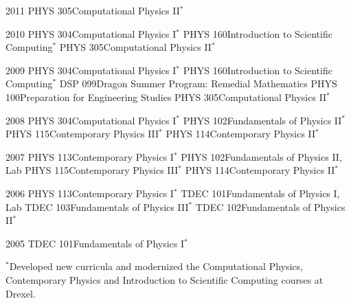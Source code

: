 \documentclass[]{scrartcl}
\begin{document}
\begin{cleanCV}





\newcommand{\TeachingNote}{$^*$}

\Teaching
{2011}
{PHYS 305}{Computational Physics II\TeachingNote}

\Teaching
{2010}
{PHYS 304}{Computational Physics I\TeachingNote}
\Teaching
{}
{PHYS 160}{Introduction to Scientific Computing\TeachingNote}
\Teaching
{}
{PHYS 305}{Computational Physics II\TeachingNote}

\Teaching
{2009}
{PHYS 304}{Computational Physics I\TeachingNote}
\Teaching
{}
{PHYS 160}{Introduction to Scientific Computing\TeachingNote}
\Teaching
{}
{DSP 099}{Dragon Summer Program: Remedial Mathematics}
\Teaching
{}
{PHYS 100}{Preparation for Engineering Studies}
\Teaching
{}
{PHYS 305}{Computational Physics II\TeachingNote}

\Teaching
{2008}
{PHYS 304}{Computational Physics I\TeachingNote}
\Teaching
{}
{PHYS 102}{Fundamentals of Physics II\TeachingNote}
\Teaching
{}
{PHYS 115}{Contemporary Physics III\TeachingNote}
\Teaching
{}
{PHYS 114}{Contemporary Physics II\TeachingNote}

\Teaching
{2007}
{PHYS 113}{Contemporary Physics I\TeachingNote}
\Teaching
{}
{PHYS 102}{Fundamentals of Physics II, Lab}
\Teaching
{}
{PHYS 115}{Contemporary Physics III\TeachingNote}
\Teaching
{}
{PHYS 114}{Contemporary Physics II\TeachingNote}

\Teaching
{2006}
{PHYS 113}{Contemporary Physics I\TeachingNote}
\Teaching
{}
{TDEC 101}{Fundamentals of Physics I, Lab}
\Teaching
{}
{TDEC 103}{Fundamentals of Physics III\TeachingNote}
\Teaching
{}
{TDEC 102}{Fundamentals of Physics II\TeachingNote}

\Teaching
{2005}
{TDEC 101}{Fundamentals of Physics I\TeachingNote}

\TeachingNote{\small Developed new curricula and modernized the Computational Physics, Contemporary Physics and Introduction to Scientific Computing courses at Drexel.}

\end{cleanCV}
\end{document}
